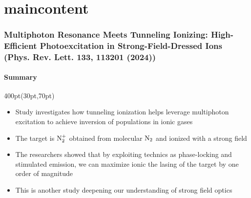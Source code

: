 
\section{maincontent}


\begin{frame}
\frametitle{
Multiphoton Resonance Meets Tunneling Ionizing:
High-Efficient Photoexcitation in Strong-Field-Dressed Ions\\
\small (Phys. Rev. Lett. \textbf{133}, 113201 (2024)) 
}
\framesubtitle{Summary}


\footnotesize
\begin{textblock*}{400pt}(30pt,70pt)
\begin{itemize}
\item Study investigates how tunneling ionization helps leverage 
multiphoton excitation to achieve inversion of populations in ionic gases
\item The target is ${\rm N}_2^+$ obtained from molecular ${\rm N}_2$ 
and ionized  with a strong field
\item The researchers showed that by exploiting technics as phase-locking
and stimulated emission, we can maximize ionic the lasing of the target
by one order of magnitude
\item This is another study deepening our understanding of strong field optics
\end{itemize}
\end{textblock*}
 
\end{frame}





